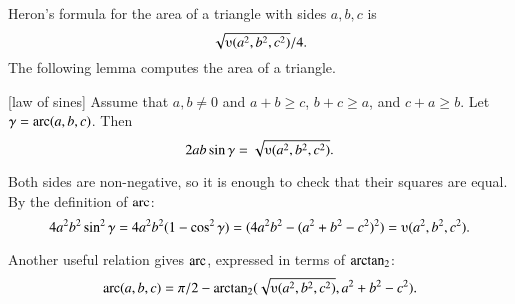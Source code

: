Heron's formula for the area of 
a triangle with sides $a,b,c$ is $$\sqrt{\ups(a^2,b^2,c^2)}/4.$$  
The following
lemma  computes the area of a triangle.  

\begin{lemma}[law of sines]
Assume that $a,b\ne 0$ and $a+b\ge c$, $b+c\ge a$, and $c+a\ge b$.
Let $\gamma=\operatorname{arc}(a,b,c)$.  Then
        $$2 a b \sin\gamma = \sqrt{\ups(a^2,b^2,c^2)}.$$
\end{lemma}
\begin{proved}
Both sides are non-negative, so it is enough to check
that their squares are equal.  By the definition of $\operatorname{arc}$:
      $$4 a^2 b^2 \sin^2\gamma = 4 a^2 b^2 (1-\cos^2\gamma) = (4 a^2 b^2 - (a^2 + b^2 -
      c^2)^2) = \ups(a^2,b^2,c^2).$$
\swallowed\end{proved}

Another useful relation gives $\operatorname{arc}$, expressed in terms of ${\operatorname{arctan_2}}$:
  $$
  \arc(a,b,c) = 
    \pi/2 - \atn({\sqrt{\ups(a^2,b^2,c^2)}},{ a^2 + b^2 - c^2}).
    $$

%
%
%
%
%
%
%
%
%
%


